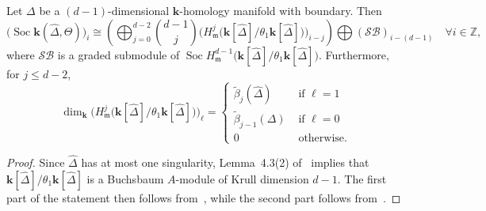 \documentclass[ALCO,ThmDefs,Unicode,epreuves]{cedram}
\DeclareMathOperator{\Soc}{Soc}
\newcommand{\complet}[1]{\hat{#1}}
\newcommand{\SB}{\mathcal{SB}}
\newcommand{\field}{\mathbf{k}}
\newcommand{\Z}{{\mathbb Z}}
\newcommand{\mideal}{\ensuremath{\mathfrak{m}}}
\begin{document}
\begin{lemma} \label{mod-theta1-decompos}
Let $\Delta$ be a $(d-1)$-dimensional $\field$-homology manifold with boundary. Then 
\[
\big(\Soc\field(\complet{\Delta},\Theta)\big)_i\cong \left(\bigoplus_{j=0}^{d-2}\binom{d-1}{j}\big(H^j_\mideal\big(\field[\complet{\Delta}]/\theta_1\field[\complet{\Delta}]\big)\big)_{i-j}\right)\bigoplus (\SB)_{i-(d-1)} \quad \forall i\in\Z,
\]
where $\SB$ is a graded submodule of $\Soc H^{d-1}_\mideal\big(\field[\complet{\Delta}]/\theta_1\field[\complet{\Delta}]\big)$.
Furthermore, for $j\leq d-2$,
\[
\dim_\field \big(H^j_\mideal\big(\field[\complet{\Delta}]/\theta_1\field[\complet{\Delta}]\big)\big)_\ell=
\begin{cases}
\tilde{\beta}_j(\complet{\Delta}) & \mbox{ if $\ell=1$}\\
\tilde{\beta}_{j-1}(\Delta) & \mbox{ if $\ell=0$}\\
0 & \mbox{ otherwise}.
\end{cases}
\]
\end{lemma}
\begin{proof} 
Since $\complet{\Delta}$ has at most one singularity, Lemma~4.3(2) of~\cite{Novik-Swartz-12} implies that $\field[\complet{\Delta}]/\theta_1\field[\complet{\Delta}]$ is a Buchsbaum $A$-module of Krull dimension $d-1$. The first part of the statement then follows from~\cite[Theorem~2.2]{Novik-Swartz-09:Socles}, while the second part follows from~\cite[Lemma~4.3(1) and Theorem~4.7]{Novik-Swartz-12}.
\end{proof}
\end{document}
